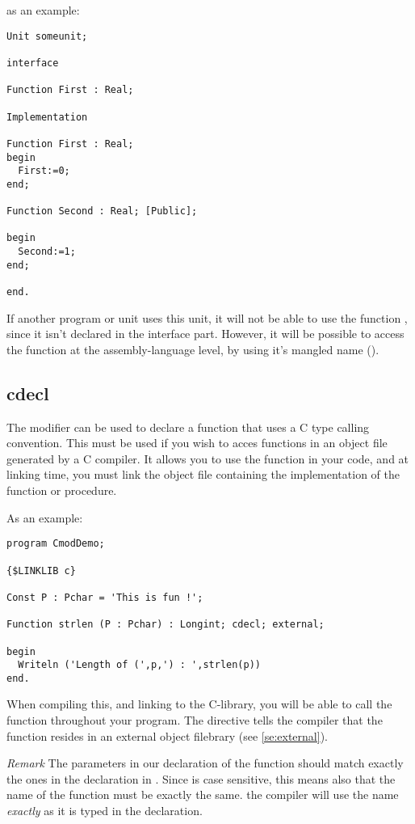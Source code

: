 \documentclass{report}
\begin{document}
as an example:
\begin{CodEx}
\begin{verbatim}
Unit someunit;

interface

Function First : Real;

Implementation

Function First : Real;
begin
  First:=0;
end;

Function Second : Real; [Public];

begin
  Second:=1;
end;

end.
\end{verbatim} 
\end{CodEx}
If another program or unit uses this unit, it will not be able to use the
function , since it isn't declared in the interface part.
However, it will be possible to access the function  at the
assembly-language level, by using it's mangled name (\progref).

\subsection{cdecl}
\label{se:cdecl}
The  modifier can be used to declare a function that uses a C
type calling convention. This must be used if you wish to acces functions in
an object file generated by a C compiler. It allows you to use the function in
your code, and at linking time, you must link the object file containing the
 implementation of the function or procedure.

As an example:
\begin{CodEx}
\begin{verbatim}
program CmodDemo;

{$LINKLIB c}

Const P : Pchar = 'This is fun !';

Function strlen (P : Pchar) : Longint; cdecl; external;

begin
  Writeln ('Length of (',p,') : ',strlen(p))
end.
\end{verbatim}
\end{CodEx}
When compiling this, and linking to the C-library, you will be able to call
the  function throughout your program. The 
directive tells the compiler that the function resides in an external
object filebrary (see \ref{se:external}). 

{\em Remark} The parameters in our declaration of the  function should 
match exactly the ones in the declaration in . Since  is case 
sensitive, this means also that the name of the
function must be exactly the same. the \fpc compiler will use the name {\em
exactly} as it is typed in the declaration.
\end{document}
